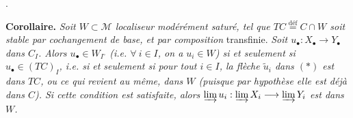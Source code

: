 . %

\textbf{Corollaire.} \textit{Soit $W \subset \mathcal{M}$ localiseur modérément saturé, tel que $TC \overset{\text{déf}}{=} C \cap W$ soit stable par cochangement de base, et par composition} transfinie. \textit{Soit $u_\bullet : X_\bullet \longrightarrow Y_\bullet$ dans $C_I$. Alors $u_\bullet \in W_{I^{\circ}}$ (i.e. $\forall\ i \in I$, on a $u_i \in W$) si et seulement si $u_\bullet \in (TC)_I$, i.e. si et seulement si pour tout $i \in I$, la flèche $\tilde{u}_i$ dans $(*)$ est dans $TC$, ou ce qui}
\textit{revient au même, dans $W$ (puisque par hypothèse elle est déjà dans $C$). Si cette condition est satisfaite, alors $\varinjlim u_i : \varinjlim X_i \longrightarrow \varinjlim Y_i$ est dans $W$.}


